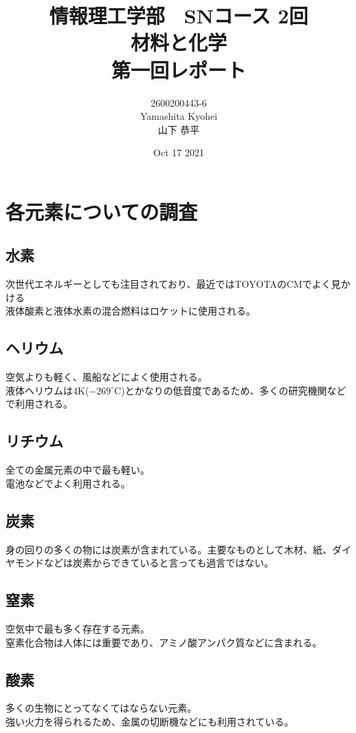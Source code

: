 \documentclass[dvipdfmx,autodetect-engine,titlepage]{jsarticle}
\title{情報理工学部　SNコース 2回\\
材料と化学\\
第一回レポート}
\author{2600200443-6\\Yamashita Kyohei\\山下 恭平}
\date{Oct 17 2021}
\begin{document}
\maketitle

\section{各元素についての調査}

\subsection{水素}
次世代エネルギーとしても注目されており、最近ではTOYOTAのCMでよく見かける\\
液体酸素と液体水素の混合燃料はロケットに使用される。

\subsection{ヘリウム}
空気よりも軽く、風船などによく使用される。\\
液体ヘリウムは4K($-269^\circ$C)とかなりの低音度であるため、多くの研究機関などで利用される。

\subsection{リチウム}
全ての金属元素の中で最も軽い。\\
電池などでよく利用される。

\subsection{炭素}
身の回りの多くの物には炭素が含まれている。主要なものとして木材、紙、ダイヤモンドなどは炭素からできていると言っても過言ではない。

\subsection{窒素}
空気中で最も多く存在する元素。\\
窒素化合物は人体には重要であり、アミノ酸アンパク質などに含まれる。

\subsection{酸素}
多くの生物にとってなくてはならない元素。\\
強い火力を得られるため、金属の切断機などにも利用されている。
\end{document}
